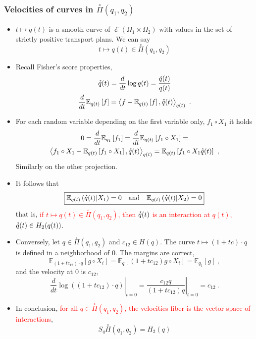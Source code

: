 \documentclass[xcolor=svgnames]{beamer}
\DeclareMathOperator{\Maxexp}{\mathcal E}
\newcommand{\condexpat}[3]{\mathbb E_{#1}\left(#2 \middle| #3\right)}
\newcommand{\derivby}[1]{\frac{d}{d#1}}
\newcommand{\expectat}[2]{\mathbb E_{#1}\left[#2\right]}
\newcommand{\logof}[1]{\log\left(#1\right)}
\newcommand{\maxexpat}[1]{\Maxexp\left(#1\right)}
\newcommand{\openplan}[2]{\overset{\circ}\Pi\left(#1,#2\right)}
\newcommand{\rosso}[1]{\textcolor{red}{#1}}
\newcommand{\scalarat}[3]{\left\langle#2,#3\right\rangle_{#1}}
\newcommand{\velocity}[1]{\accentset{\star}{#1}}
\renewcommand{\emph}{\rosso}
\begin{document}
\begin{frame}\small\frametitle{Velocities of curves in $\overset{\circ}\Pi(q_1,q_2)$}

\begin{itemize}
    \item $t \mapsto q(t)$ is a smooth curve of $\maxexpat {\Omega_1 \times \Omega_2}$ with values in the set of strictly positive transport plans. We can say
    \begin{equation*}
      t \mapsto q(t) \in \overset{\circ}{\Pi}(q_1,q_2)
    \end{equation*}
    \item Recall Fisher's score properties,
    \begin{gather*}
        \velocity q(t) = \derivby t \log q(t) = \frac {\dot q(t)}{q(t)} \\
        \derivby t \expectat {q(t)} f = \scalarat {q(t)} {f - \expectat {q(t)} f}{\velocity q(t)} \ . 
    \end{gather*}
    \item For each random variable depending on the first variable only, $f_1\circ X_1$ it holds
\begin{multline*} 0 = \derivby t \expectat {q_1} {f_1} =  \derivby t \expectat {q(t)} {f_1\circ X_1} = \\ \scalarat {q(t)}  {f_1 \circ X_1 - \expectat {q(t)} {f_1\circ X_1}} {\velocity q(t)} = \expectat {q(t)} {f_1\circ X_1 \velocity q(t)} \ , \end{multline*}  Similarly on the other projection.
\item It follows that
\begin{equation*}
\boxed{\condexpat {q(t)} {\velocity q(t)} {X_1} = 0 \quad \text{and} \quad \condexpat {q(t)} {\velocity q(t)} {X_2} = 0}
\end{equation*}
that is, \emph{if $t \mapsto q(t) \in \openplan{q_1}{q_2}$, then $\velocity q(t)$ is an interaction at $q(t)$, $\velocity q(t) \in H_2(q(t))$}.
\item Conversely, let $q \in \openplan{q_1}{q_2}$ and $c_{12} \in H(q)$. The curve $t \mapsto (1+tc) \cdot q$ is defined in a neighborhood of 0. The margins are correct,
\begin{equation*}
    \expectat {(1+tc_{12}) \cdot q}{g\circ X_i} = \expectat q {(1+tc_{12})g\circ X_i} = \expectat {q_1} g \ ,
\end{equation*}
and the velocity at 0 is $c_{12}$,
\begin{equation*}
   \left. \derivby t \logof{(1+tc_{12}) \cdot q}
\right|_{t=0} = \left. \frac {c_{12} q}{(1+tc_{12})q} \right|_{t=0} = c_{12} \ .
\end{equation*}
\item In conclusion, \emph{for all $q \in \overset{\circ}{\Pi}(q_1,q_2)$, the velocities fiber is the vector space of interactions},
\begin{equation*}
 \boxed{S_q \overset{\circ}\Pi(q_1,q_2) = H_2(q)}
\end{equation*}


\end{itemize}
\end{frame}
\end{document}
